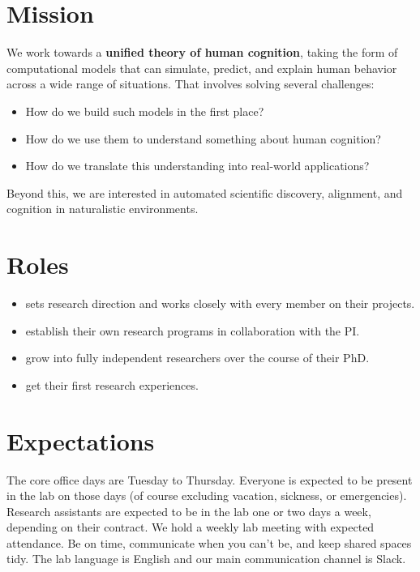 \section*{Mission}
We work towards a \textbf{unified theory of human cognition}, taking the form of
computational models that can simulate, predict, and explain human behavior
across a wide range of situations. That involves solving several challenges:
\begin{itemize}
  \item {} How do we build such models in the first place?
  \item {} How do we use them to understand something about human cognition?
  \item {} How do we translate this understanding into real-world applications?
\end{itemize}
Beyond this, we are interested in automated scientific discovery, alignment, and
cognition in naturalistic environments.

\section*{Roles}
\begin{itemize}
  \item {} sets research direction and works closely with every member on their projects.
  \item {} establish their own research programs in collaboration with the PI.
  \item {} grow into fully independent researchers over the course of their PhD.
  \item {} get their first research experiences.
\end{itemize}

\section*{Expectations}
 The core office days are Tuesday to Thursday.
Everyone is expected to be present in the lab on those days (of course excluding
vacation, sickness, or emergencies). Research assistants are expected to be in
the lab one or two days a week, depending on their contract. We hold a weekly
lab meeting with expected attendance. Be on time, communicate when you can't be,
and keep shared spaces tidy. The lab language is English and our main
communication channel is Slack.

